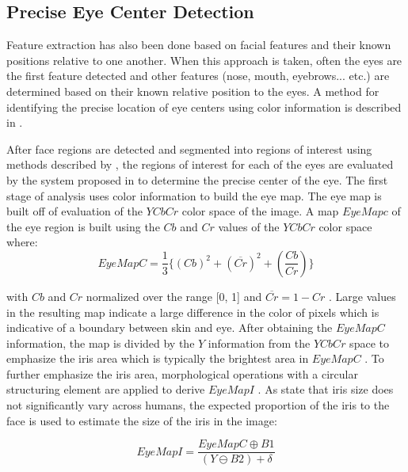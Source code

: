 
\subsection{Precise Eye Center Detection} \label{FE1}
Feature extraction has also been done based on facial features and their known positions relative to one another. When this approach is taken, often the eyes are the first feature detected and other features (nose, mouth, eyebrows... etc.) are determined based on their known relative position to the eyes. A method for identifying the precise location of eye centers using color information is described in \cite{skodras2015precise}.

After face regions are detected and segmented into regions of interest using methods described by \cite{viola2004robust}, the regions of interest for each of the eyes are evaluated by the system proposed in \cite{skodras2015precise} to determine the precise center of the eye. The first stage of analysis uses color information to build the eye map. The eye map is built off of evaluation of the $YCbCr$ color space of the image. %
 A map $EyeMapc$  of the eye region is built using the $Cb$ and $Cr$ values of the $YCbCr$ color space where:
\begin{equation}
\label{eqn_EyeMapC}
EyeMapC = \frac{1}{3} \{(Cb)^2 + (\overline{Cr})^2 + (\frac{Cb}{Cr}) \}
\end{equation}
 
 with $Cb$ and $Cr$ normalized over the range [0, 1] and $\overline{Cr} = 1 - Cr$ \cite{skodras2015precise}. Large values in the resulting map indicate a large difference in the color of pixels which is indicative of a boundary between skin and eye. After obtaining the $EyeMapC$ information, the map is divided by the  $Y$ information from the $YCbCr$ space to emphasize the iris area which is typically the brightest area in $EyeMapC$ \cite{skodras2015precise}. To further emphasize the iris area, morphological operations with a circular structuring element are applied to derive $EyeMapI$ \cite{skodras2015precise}. As \cite{skodras2015precise} state that iris size does not significantly vary across humans, the expected proportion of the iris to the face is used to estimate the size of the iris in the image:
 
\begin{equation}
\label{eqn_EyeMapC}
EyeMapI = \frac{EyeMapC \oplus B1}{(Y\ominus B2) + \delta}
\end{equation}
 
